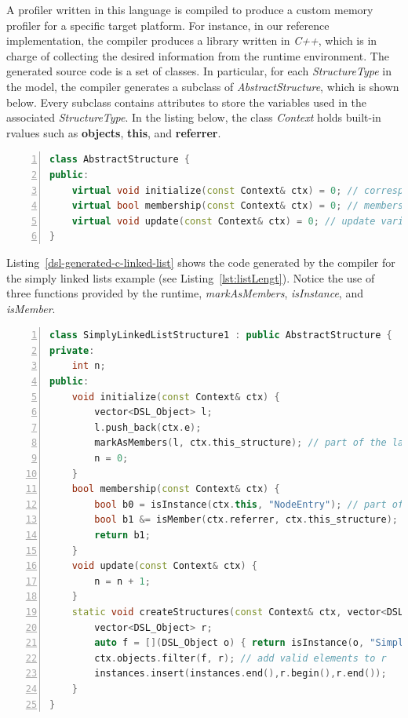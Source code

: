 A profiler written in this language is compiled to produce a custom memory profiler for a specific target platform.
For instance, in our reference implementation, the compiler produces a library written in \textit{C++}, which is in charge of collecting the desired information from the runtime environment.
The generated source code is a set of classes.
In particular, for each \textit{StructureType} in the model, the compiler generates a subclass of \textit{AbstractStructure},  which is shown below.
Every subclass contains attributes to store the variables used in the associated \textit{StructureType}.
In the listing below, the class \textit{Context} holds built-in rvalues such as \textbf{objects}, \textbf{this}, and \textbf{referrer}.
\begin{lstlisting}[language=C++, frame=L,
numbers=left,
numberstyle=\color{black}\scriptsize,xleftmargin=2\parindent]
class AbstractStructure {
public:
	virtual void initialize(const Context& ctx) = 0; // correspond to constructor
	virtual bool membership(const Context& ctx) = 0; // membership function
	virtual void update(const Context& ctx) = 0; // update variables
}
\end{lstlisting}

Listing~\ref{dsl-generated-c-linked-list} shows the code generated by the compiler for the simply linked lists example (see Listing~\ref{lst:listLengt}).
Notice the use of three functions provided by the runtime, \textit{markAsMembers}, \textit{isInstance}, and \textit{isMember}. 

\begin{lstlisting}[language=C++, frame=L,
numbers=left,
numberstyle=\color{black}\scriptsize,xleftmargin=2\parindent, label=dsl-generated-c-linked-list,
caption={To represent a structure type, we declare a subclass of AbstractStructure.}]
class SimplyLinkedListStructure1 : public AbstractStructure {
private:
	int n;
public:
	void initialize(const Context& ctx) {
		vector<DSL_Object> l;
		l.push_back(ctx.e);
		markAsMembers(l, ctx.this_structure); // part of the language runtime support
		n = 0;
	}
	bool membership(const Context& ctx) {
		bool b0 = isInstance(ctx.this, "NodeEntry"); // part of the language runtime support
		bool b1 &= isMember(ctx.referrer, ctx.this_structure); // part of the runtime support
		return b1;
	}
	void update(const Context& ctx) {
		n = n + 1;
	}
	static void createStructures(const Context& ctx, vector<DSL_Object>& instances) {
		vector<DSL_Object> r;
		auto f = [](DSL_Object o) { return isInstance(o, "SimplyLinkedList")};
		ctx.objects.filter(f, r); // add valid elements to r
		instances.insert(instances.end(),r.begin(),r.end()); 
	}
}
\end{lstlisting}

